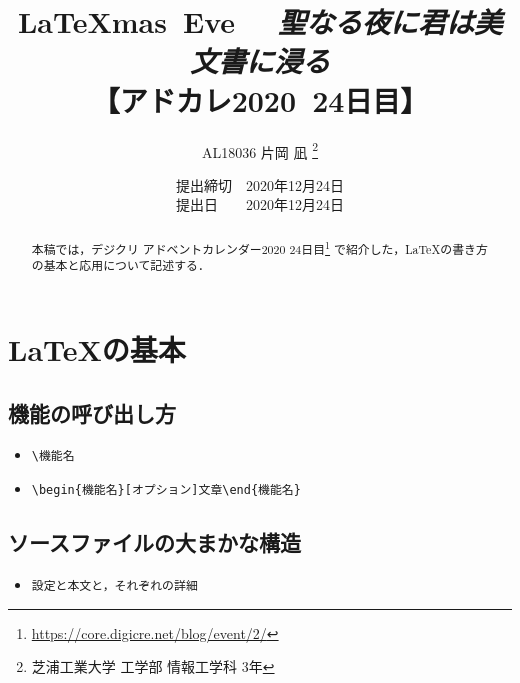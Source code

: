 \documentclass[a4paper, papersize]{jsarticle}
\title{
\vspace{-1cm} %
\LaTeX mas\ Eve~ ~{\it 聖なる夜に君は美文書に浸る} \\
【アドカレ2020~24日目】}
\author{AL18036 片岡 凪 \thanks{芝浦工業大学 工学部 情報工学科 3年}}
\date{提出締切　2020年12月24日 \\
提出日　　2020年12月24日}
\begin{document}

\maketitle


\setcounter{tocdepth}{2}
\tableofcontents
\newpage


\begin{abstract}
本稿では，デジクリ アドベントカレンダー2020 24日目\footnote{\url{https://core.digicre.net/blog/event/2/}} で紹介した，LaTeXの書き方の基本と応用について記述する．
\end{abstract}


\section{LaTeXの基本}


\subsection{機能の呼び出し方}
\begin{itemize}
\item \verb|\機能名|
\item \verb|\begin{機能名}[オプション]文章\end{機能名}|
\end{itemize}


\subsection{ソースファイルの大まかな構造}
\begin{itemize}
\item \verb|設定と本文と，それぞれの詳細|
\end{itemize}
\end{document}
